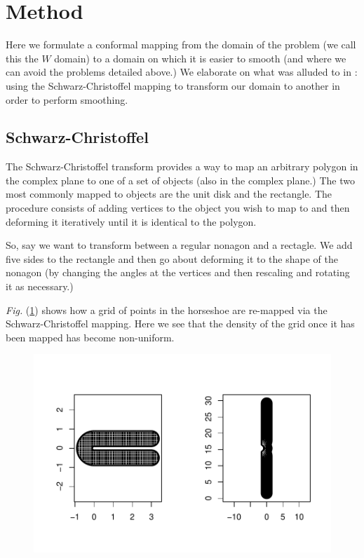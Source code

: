 \documentclass[a4paper,10pt]{amsart}
\newcommand{\sch}{Schwarz-Christoffel }
\newcommand{\Fig}[1]{\emph{Fig.} (\ref{#1})}
\begin{document}
\section{Method}

Here we formulate a conformal mapping from the domain of the problem (we call this the $W$ domain) to a domain on which it is easier to smooth (and where we can avoid the problems detailed above.) We elaborate on what was alluded to in \cite{eilerstalk}: using the \sch mapping to transform our domain to another in order to perform smoothing.

\subsection{\sch}

The \sch transform provides a way to map an arbitrary polygon in the complex plane to one of a set of objects (also in the complex plane.) The two most commonly mapped to objects are the unit disk and the rectangle. The procedure consists of adding vertices to the object you wish to map to and then deforming it iteratively until it is identical to the polygon.

So, say we want to transform between a regular nonagon and a rectagle. We add five sides to the rectangle and then go about deforming it to the shape of the nonagon (by changing the angles at the vertices and then rescaling and rotating it as necessary.) 

\Fig{hsgridmapping} shows how a grid of points in the horseshoe are re-mapped via the \sch mapping. Here we see that the density of the grid once it has been mapped has become non-uniform.


\begin{figure}
\centering
\includegraphics[trim=0in 0in 0in 0in]{figs/hsgridmapping.pdf} \\
\caption{}
\label{hsgridmapping}
\end{figure}
\end{document}
